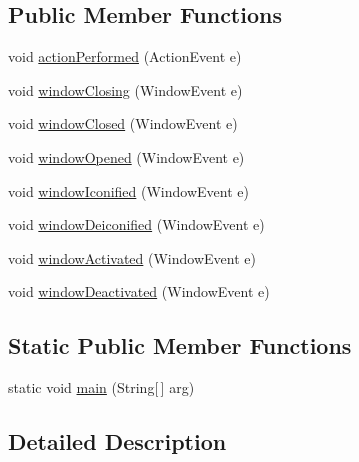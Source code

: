 \subsection*{Public Member Functions}
\begin{DoxyCompactItemize}
\item 
void \hyperlink{classgov_1_1fnal_1_1ppd_1_1dd_1_1chat_1_1original_1_1Orig__ServerGUI_ac4c6afb3edd1deb4001062567e12840a}{action\-Performed} (Action\-Event e)
\item 
void \hyperlink{classgov_1_1fnal_1_1ppd_1_1dd_1_1chat_1_1original_1_1Orig__ServerGUI_a68570cfc403a1b0bde70047f0689a8b7}{window\-Closing} (Window\-Event e)
\item 
void \hyperlink{classgov_1_1fnal_1_1ppd_1_1dd_1_1chat_1_1original_1_1Orig__ServerGUI_a67e6bea6db2e16d197cefdbf191e9ea9}{window\-Closed} (Window\-Event e)
\item 
void \hyperlink{classgov_1_1fnal_1_1ppd_1_1dd_1_1chat_1_1original_1_1Orig__ServerGUI_a852695da235146a4c5638244377d5aee}{window\-Opened} (Window\-Event e)
\item 
void \hyperlink{classgov_1_1fnal_1_1ppd_1_1dd_1_1chat_1_1original_1_1Orig__ServerGUI_ad233c2a5ae18811576a45c4f61707e95}{window\-Iconified} (Window\-Event e)
\item 
void \hyperlink{classgov_1_1fnal_1_1ppd_1_1dd_1_1chat_1_1original_1_1Orig__ServerGUI_ab58029ba75559c91df67b5f5ce230980}{window\-Deiconified} (Window\-Event e)
\item 
void \hyperlink{classgov_1_1fnal_1_1ppd_1_1dd_1_1chat_1_1original_1_1Orig__ServerGUI_a9b13a4ab2b18d709bc0d565984f7fe69}{window\-Activated} (Window\-Event e)
\item 
void \hyperlink{classgov_1_1fnal_1_1ppd_1_1dd_1_1chat_1_1original_1_1Orig__ServerGUI_a67ee46e8b677f0808920183a690bf0c0}{window\-Deactivated} (Window\-Event e)
\end{DoxyCompactItemize}
\subsection*{Static Public Member Functions}
\begin{DoxyCompactItemize}
\item 
static void \hyperlink{classgov_1_1fnal_1_1ppd_1_1dd_1_1chat_1_1original_1_1Orig__ServerGUI_a6e0896b287b2bb44e1eb39dc5cc4713a}{main} (String\mbox{[}$\,$\mbox{]} arg)
\end{DoxyCompactItemize}


\subsection{Detailed Description}


